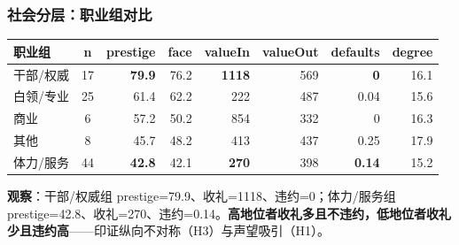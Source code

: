 \documentclass[AutoFakeBold,AutoFakeSlant]{beamer}
\begin{document}
\begin{frame}
    \frametitle{社会分层：职业组对比}
    \tiny
    \centering
    \begin{tabularx}{\textwidth}{|l|c|r|r|r|r|r|r|}
        \toprule
        \textbf{职业组} & \textbf{n} & \textbf{prestige} & \textbf{face} & \textbf{valueIn} & \textbf{valueOut} & \textbf{defaults} & \textbf{degree} \\
        \midrule
        干部/权威 & 17 & \textbf{79.9} & 76.2 & \textbf{1118} & 569 & \textbf{0} & 16.1 \\
        白领/专业 & 25 & 61.4 & 62.2 & 222 & 487 & 0.04 & 15.6 \\
        商业 & 6 & 57.2 & 50.2 & 854 & 332 & 0 & 16.3 \\
        其他 & 8 & 45.7 & 48.2 & 413 & 437 & 0.25 & 17.9 \\
        体力/服务 & 44 & \textbf{42.8} & 42.1 & \textbf{270} & 398 & \textbf{0.14} & 15.2 \\
        \bottomrule
    \end{tabularx}
    \vspace{0.3em}
    \scriptsize
    \textbf{观察}：干部/权威组 prestige=79.9、收礼=1118、违约=0；体力/服务组 prestige=42.8、收礼=270、违约=0.14。\textbf{高地位者收礼多且不违约，低地位者收礼少且违约高}——印证纵向不对称（H3）与声望吸引（H1）。
\end{frame}
\end{document}

